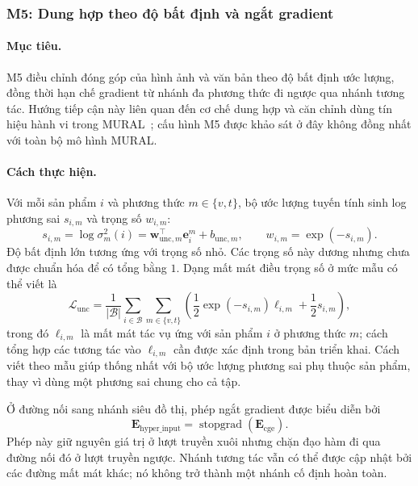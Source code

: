 \subsubsection{M5: Dung hợp theo độ bất định và ngắt gradient}

\paragraph{Mục tiêu.}
M5 điều chỉnh đóng góp của hình ảnh và văn bản theo độ bất định ước lượng, đồng thời hạn chế gradient từ nhánh đa phương thức đi ngược qua nhánh tương tác. Hướng tiếp cận này liên quan đến cơ chế dung hợp và căn chỉnh dùng tín hiệu hành vi trong MURAL~\cite{mousavi2026mural}; cấu hình M5 được khảo sát ở đây không đồng nhất với toàn bộ mô hình MURAL.

\paragraph{Cách thực hiện.}
Với mỗi sản phẩm $i$ và phương thức $m\in\{v,t\}$, bộ ước lượng tuyến tính sinh log phương sai $s_{i,m}$ và trọng số $w_{i,m}$:
\begin{equation}
s_{i,m}=\log\sigma_m^2(i)=\mathbf w_{\text{unc},m}^{\top}\mathbf e_i^m+b_{\text{unc},m},
\qquad w_{i,m}=\exp(-s_{i,m}).
\end{equation}
Độ bất định lớn tương ứng với trọng số nhỏ. Các trọng số này dương nhưng chưa được chuẩn hóa để có tổng bằng $1$. Dạng mất mát điều trọng số ở mức mẫu có thể viết là
\begin{equation}
\mathcal L_{\text{unc}}=\frac{1}{|\mathcal B|}\sum_{i\in\mathcal B}\sum_{m\in\{v,t\}}
\left(\frac12\exp(-s_{i,m})\ell_{i,m}+\frac12s_{i,m}\right),
\end{equation}
trong đó $\ell_{i,m}$ là mất mát tác vụ ứng với sản phẩm $i$ ở phương thức $m$; cách tổng hợp các tương tác vào $\ell_{i,m}$ cần được xác định trong bản triển khai. Cách viết theo mẫu giúp thống nhất với bộ ước lượng phương sai phụ thuộc sản phẩm, thay vì dùng một phương sai chung cho cả tập.

Ở đường nối sang nhánh siêu đồ thị, phép ngắt gradient được biểu diễn bởi
\begin{equation}
\mathbf E_{\text{hyper\_input}}=\operatorname{stopgrad}(\mathbf E_{\text{cge}}).
\label{eq:stopgrad}
\end{equation}
Phép này giữ nguyên giá trị ở lượt truyền xuôi nhưng chặn đạo hàm đi qua đường nối đó ở lượt truyền ngược. Nhánh tương tác vẫn có thể được cập nhật bởi các đường mất mát khác; nó không trở thành một nhánh cố định hoàn toàn.

